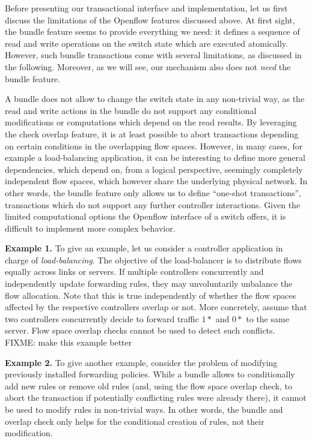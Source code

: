 \documentclass[conference]{sigcomm-alternate}
\begin{document}
Before presenting our transactional interface and implementation,
let us first discuss the limitations of the Openflow features discussed above.
At first sight, the bundle feature seems to provide everything
we need: it defines a sequence of read and write operations
 on the switch state which are executed atomically.
 However, such bundle transactions come with several
 limitations, as discussed in the following. Moreover,
 as we will see, our mechanism also does not \emph{need}
 the bundle feature. 

A bundle does not allow
 to change the switch state in any non-trivial way,
 as the read and write actions in the bundle do
 not support any conditional modifications or computations which
 depend on the read results. By leveraging
 the check overlap feature, it is at least possible
 to abort transactions depending on certain conditions
 in the overlapping
 flow spaces. However, in many cases, for example
 a load-balancing application,
 it can be interesting to define more general
 dependencies, which depend on, from a logical perspective,
 seemingly
 completely independent flow spaces,
 which however share the underlying physical network.
In other words, the bundle feature only allows us to
define ``one-shot transactions'',
transactions which do not support any further controller interactions.
Given
the limited computational options the Openflow interface of a switch offers,
it is difficult to implement more complex behavior.

\textbf{Example 1.} To give an example, let us consider a controller application in charge
of \emph{load-balancing}. The objective of the load-balancer
is to distribute flows equally across links or servers.
If multiple controllers concurrently and independently
update forwarding rules, they may unvoluntarily
unbalance the flow allocation. Note that this
is true independently of whether the flow spaces
affected by the respective controllers overlap or not.
More concretely, assume that two controllers concurrently
decide to forward traffic $1*$ and $0*$ to the same server.
Flow space overlap checks cannot be used to detect
such conflicts.
FIXME: make this example better

\textbf{Example 2.} To give another example,
consider the problem of modifying previously
installed forwarding policies.
While a bundle allows to conditionally add new rules or remove
old rules (and, using the flow space overlap
check, to abort the transaction if potentially conflicting
rules were already there), it cannot be used
to modify rules in non-trivial ways.
In other words, the bundle and overlap check only helps
for the conditional creation of rules, not their modification.
\end{document}

